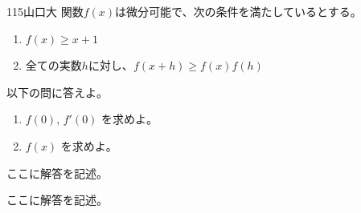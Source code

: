 \begin{prob}{115}{}{山口大}
 関数$f(x)$は微分可能で、次の条件を満たしているとする。
 \begin{enumerate}
  \renewcommand{\labelenumi}{(\alph{enumi})}
  \item $f(x)\ge x+1$
  \item 全ての実数$h$に対し、$f(x+h)\ge f(x)f(h)$
 \end{enumerate}
 以下の問に答えよ。
 \begin{enumerate}
  \item $f(0)$, $f'(0)$ を求めよ。
  \item $f(x)$ を求めよ。
 \end{enumerate}
\end{prob}
ここに解答を記述。

ここに解答を記述。